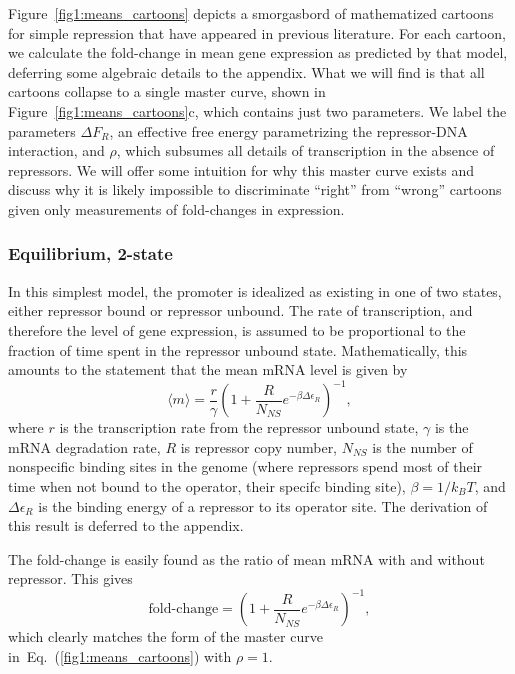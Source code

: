 \documentclass[12pt]{article}%
\newcommand{\fig}[1]{Figure~\ref{#1}}
\newcommand{\eq}[1]{Eq.~(\ref{#1})}
\begin{document}
\fig{fig1:means_cartoons} depicts a smorgasbord
of mathematized cartoons for simple repression that have appeared
in previous literature. For each cartoon, we calculate the
fold-change in mean gene expression as predicted by that model,
deferring some algebraic details to the appendix.
What we will find is that all cartoons collapse to a single
master curve, shown in \fig{fig1:means_cartoons}c, which contains
just two parameters. We label the parameters $\Delta F_R$, an
effective free energy parametrizing the repressor-DNA
interaction, and $\rho$, which subsumes all details of
transcription in the absence of repressors.
We will offer some intuition for why this master curve exists and discuss
why it is likely impossible to discriminate ``right'' from ``wrong''
cartoons given only measurements of fold-changes in expression.

\subsubsection{Equilibrium, 2-state}
In this simplest model, the promoter is idealized as existing in
one of two states, either repressor bound or repressor unbound.
The rate of transcription, and therefore the level of gene
expression, is assumed to be proportional to the fraction of time
spent in the repressor unbound state.
Mathematically, this amounts to the statement that the mean mRNA level is
given by
\begin{equation}
\langle m \rangle = \frac{r}{\gamma}
        \left(1 + \frac{R}{N_{NS}} e^{-\beta\Delta\epsilon_R}\right)^{-1},
\end{equation}
where $r$ is the transcription rate from the repressor unbound
state, $\gamma$ is the mRNA degradation rate, $R$ is repressor
copy number, $N_{NS}$ is the number of nonspecific binding sites
in the genome (where repressors spend most of their time when not
bound to the operator, their specifc binding site),
$\beta=1/k_BT$, and $\Delta\epsilon_R$ is the binding energy of a
repressor to its operator site. The derivation of this result is deferred
to the appendix.

The fold-change is easily found as the ratio of mean mRNA with
and without repressor. This gives
\begin{equation}
\text{fold-change}
= \left(1 + \frac{R}{N_{NS}} e^{-\beta\Delta\epsilon_R}\right)^{-1},
\end{equation}
which clearly matches the form of the master curve
in~\eq{fig1:means_cartoons} with $\rho=1$.
\end{document}
